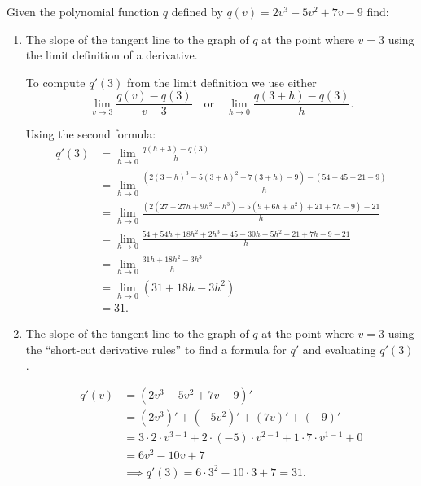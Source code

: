 \documentclass[nooutcomes, handout]{ximera}
\begin{document}
	
\begin{problem}
  Given the polynomial function $q$ defined by $q(v) = 2v^3 - 5v^2 + 7v - 9$ find:
  \begin{enumerate}

    \item
      The slope of the tangent line to the graph of $q$ at the point where $v = 3$ using the limit definition of a derivative.
      \begin{freeResponse}
        To compute $q'(3)$ from the limit definition we use either 
        \[
          \lim_{v \to 3} \frac{q(v)-q(3)}{v-3} \quad \text{or} \quad \lim_{h \to 0} \frac{q(3+h)-q(3)}{h}.
        \]

        
        Using the second formula:
        \begin{align*}
          q'(3) &= \lim_{h \to 0} \frac{q(h+3)-q(3)}{h} \\
          &= \lim_{h \to 0} \frac{(2(3+h)^3 - 5(3+h)^2 + 7(3+h) - 9) - (54 - 45 + 21 - 9)}{h}\\
          &= \lim_{h \to 0} \frac{(2(27+27h+9h^2+h^3) - 5(9+6h+h^2) + 21+7h - 9) - 21}{h} \\
          &= \lim_{h \to 0} \frac{54+54h+18h^2+2h^3-45-30h-5h^2+21+7h-9-21}{h} \\
          &= \lim_{h \to 0} \frac{31h+18h^2-3h^3}{h} \\
          &= \lim_{h \to 0} (31+18h-3h^2)\\
          &= 31.
        \end{align*}
      \end{freeResponse}


    \item

      The slope of the tangent line to the graph of $q$ at the point where $v = 3$ using the ``short-cut derivative rules'' to find a formula for $q'$ and evaluating $q'(3)$.
      \begin{freeResponse} \hfil

        \begin{align*}
          q'(v) &= (2v^3 - 5v^2 + 7v - 9)'\\
          &= (2v^3)' + (-5v^2)' + (7v)' + (-9)' \\
          &= 3\cdot 2 \cdot v^{3-1} + 2\cdot (-5)\cdot v^{2-1} + 1\cdot 7\cdot v^{1-1} + 0 \\
          &= 6v^2 - 10v + 7\\
          &\implies q'(3) = 6\cdot3^2 - 10\cdot3 + 7 = 31.
        \end{align*}
      \end{freeResponse}



\end{enumerate}
\end{problem}
\end{document}
